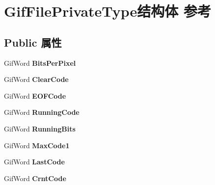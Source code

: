 \hypertarget{struct_gif_file_private_type}{}\section{Gif\+File\+Private\+Type结构体 参考}
\label{struct_gif_file_private_type}
\subsection*{Public 属性}
\begin{DoxyCompactItemize}
\item 
\mbox{\label{struct_gif_file_private_type_a6220d0d4e887ba572359e791966a5642}} 
Gif\+Word {\bfseries Bits\+Per\+Pixel}
\item 
\mbox{\label{struct_gif_file_private_type_ab3d883cf1b23004efc84c5f7c8c421e4}} 
Gif\+Word {\bfseries Clear\+Code}
\item 
\mbox{\label{struct_gif_file_private_type_a25398a1e32e4297684d4be6aa014d3f3}} 
Gif\+Word {\bfseries E\+O\+F\+Code}
\item 
\mbox{\label{struct_gif_file_private_type_ad6ec0b349acced53a9b2f44bee8a7e56}} 
Gif\+Word {\bfseries Running\+Code}
\item 
\mbox{\label{struct_gif_file_private_type_a3a1b63f89eadb21074532c50c419dbbc}} 
Gif\+Word {\bfseries Running\+Bits}
\item 
\mbox{\label{struct_gif_file_private_type_a1fc78ccee3483702afcfff6d23fa5ffe}} 
Gif\+Word {\bfseries Max\+Code1}
\item 
\mbox{\label{struct_gif_file_private_type_a3bdb9b883acbee9ae591451900991d94}} 
Gif\+Word {\bfseries Last\+Code}
\item 
\mbox{\label{struct_gif_file_private_type_a0ab4cae0ec1a0dff209a50b07005389d}} 
Gif\+Word {\bfseries Crnt\+Code}
\item 
\mbox{\label{struct_gif_file_private_type_a53d1938414ef041828be3348662b3fe4}} 

\end{DoxyCompactItemize}
